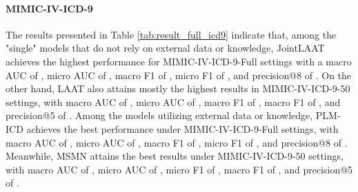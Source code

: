 \documentclass[11pt]{article}
\begin{document}
\begin{table*}[!t]
\centering
{}
\caption{Results of ICD10 code prediction models on MIMIC-IV-ICD10-Full and MIMIC-IV-ICD10-50 test sets. 
}\label{tab:result_full_icd10}
\end{table*}


\paragraph{MIMIC-IV-ICD-9} The results presented in Table \ref{tab:result_full_icd9} indicate that, among the "single" models that do not rely on external data or knowledge, JointLAAT achieves the highest performance for MIMIC-IV-ICD-9-Full settings with a macro AUC of , micro AUC of , macro F1 of , micro F1 of , and precision@8 of . On the other hand, LAAT also attains mostly the highest results in MIMIC-IV-ICD-9-50 settings, with macro AUC of , micro AUC of , macro F1 of , macro F1 of , and precision@5 of . Among the models utilizing external data or knowledge, PLM-ICD achieves the best performance under MIMIC-IV-ICD-9-Full settings, with macro AUC of , micro AUC of , macro F1 of , micro F1 of , and precision@8 of . Meanwhile, MSMN attains the best results under MIMIC-IV-ICD-9-50 settings, with macro AUC of , micro AUC of , micro F1 of , macro F1 of , and precision@5 of .
\end{document}
